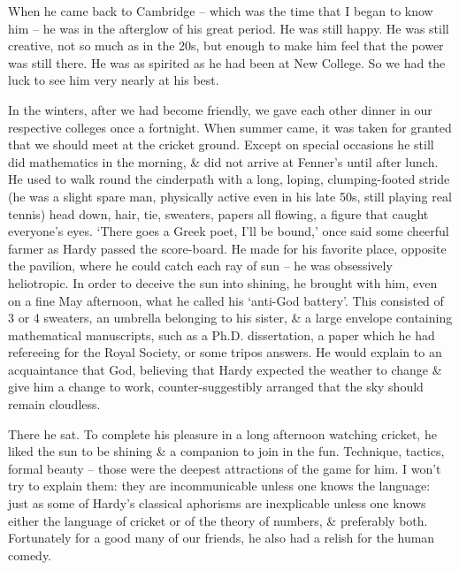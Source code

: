 \documentclass{article}
\numberwithin{equation}{section}
\begin{document}
When he came back to Cambridge -- which was the time that I began to know him -- he was in the afterglow of his great period. He was still happy. He was still creative, not so much as in the 20s, but enough to make him feel that the power was still there. He was as spirited as he had been at New College. So we had the luck to see him very nearly at his best.

In the winters, after we had become friendly, we gave each other dinner in our respective colleges once a fortnight. When summer came, it was taken for granted that we should meet at the cricket ground. Except on special occasions he still did mathematics in the morning, \& did not arrive at Fenner's until after lunch. He used to walk round the cinderpath with a long, loping, clumping-footed stride (he was a slight spare man, physically active even in his late 50s, still playing real tennis) head down, hair, tie, sweaters, papers all flowing, a figure that caught everyone's eyes. `There goes a Greek poet, I'll be bound,' once said some cheerful farmer as Hardy passed the score-board. He made for his favorite place, opposite the pavilion, where he could catch each ray of sun -- he was obsessively heliotropic. In order to deceive the sun into shining, he brought with him, even on a fine May afternoon, what he called his `anti-God battery'. This consisted of 3 or 4 sweaters, an umbrella belonging to his sister, \& a large envelope containing mathematical manuscripts, such as a Ph.D. dissertation, a paper which he had refereeing for the Royal Society, or some tripos answers. He would explain to an acquaintance that God, believing that Hardy expected the weather to change \& give him a change to work, counter-suggestibly arranged that the sky should remain cloudless.

There he sat. To complete his pleasure in a long afternoon watching cricket, he liked the sun to be shining \& a companion to join in the fun. Technique, tactics, formal beauty -- those were the deepest attractions of the game for him. I won't try to explain them: they are incommunicable unless one knows the language: just as some of Hardy's classical aphorisms are inexplicable unless one knows either the language of cricket or of the theory of numbers, \& preferably both. Fortunately for a good many of our friends, he also had a relish for the human comedy.
\end{document}
